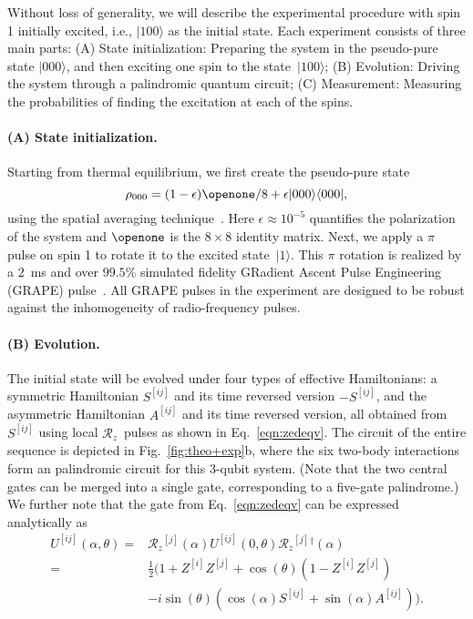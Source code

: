 \documentclass[aps,prx,10pt,
               superscriptaddress,
               twocolumn,
               longbibliography,
showpacs]{revtex4-1}
\theoremstyle{plain}
\theoremstyle{definition}
\newcommand{\bra}[1]{\mbox{$\langle #1|$}}
\newcommand{\ket}[1]{\ensuremath{|#1\rangle}}
\newcommand{\zrot}{\mathcal{R}_z}
\newcommand{\site}[1]{^{[#1]}}  %
\begin{document}
Without loss of generality, we will describe the
experimental procedure with spin 1 initially excited, i.e.,  $\ket{100}$ as
the initial state.
Each experiment consists of three main parts:
(A) State initialization: Preparing the system in the pseudo-pure state $\ket{000}$,
and then exciting one spin to the state~$\ket{100}$;
(B) Evolution: Driving the system
through a palindromic quantum circuit;
(C) Measurement: Measuring the probabilities of finding the excitation
at each of the spins.

\paragraph*{(A) State initialization.}
Starting from thermal equilibrium, we first
create the pseudo-pure state
\begin{equation}
\rho_{000}=(1-\epsilon)\openone/8+\epsilon \ket{000} \bra{000},
\end{equation}
using the spatial averaging technique~\cite{spatial}. Here $\epsilon \approx
10^{-5}$ quantifies the polarization of the system and $\openone$ is the $8\times
8$ identity matrix. Next, we apply a $\pi$ pulse on spin 1 to rotate it to the
excited state~$\ket{1}$.
This $\pi$ rotation is realized by a $2$~ms and over
$99.5$\% simulated fidelity GRadient Ascent Pulse Engineering (GRAPE)
pulse~\cite{grape1,grape2}. All GRAPE pulses in the experiment are designed
to be robust against the inhomogeneity of radio-frequency pulses.

\paragraph*{(B) Evolution.}
The initial state will be evolved under
four types of effective Hamiltonians: a symmetric Hamiltonian
$S\site{ij}$ and its time reversed version $-S\site{ij}$,
and the asymmetric Hamiltonian
$A\site{ij}$ and its time reversed version, all obtained from
$S\site{ij}$ using local $\zrot{}$~pulses as shown in Eq.~\eqref{eqn:zedeqv}.
The circuit of the entire sequence is depicted
in Fig.~\ref{fig:theo+exp}b, where
the six two-body interactions form an palindromic circuit for this
3-qubit system.  (Note that the two central gates can be merged into a
single gate, corresponding to a five-gate palindrome.)  We further note that
the gate from Eq.~\eqref{eqn:zedeqv} can be expressed analytically as
\begin{align}
U\site{ij}(\alpha, \theta)
=& \zrot{}\site{j}(\alpha) U\site{ij}(0, \theta) \zrot{}\site{j}{^\dagger}(\alpha) \\
=& \frac{1}{2} \big(1 + Z\site{i} Z\site{j} +\cos(\theta) (1- Z\site{i} Z\site{j}) \nonumber \\
& -i \sin(\theta) \left(\cos(\alpha) S\site{ij} + \sin(\alpha)A\site{ij}\right)\big).
\nonumber
\end{align}
\end{document}
